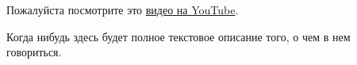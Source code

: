 
Пожалуйста посмотрите это
\href{https://www.youtube.com/watch?v=3N__tvmZrzc}{видео на YouTube}.

Когда нибудь здесь будет полное текстовое описание того, о чем в нем говориться.

